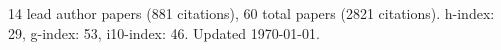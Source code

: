 14 lead author papers (881 citations),
60 total papers (2821 citations).\newline
h-index: 29, g-index: 53, i10-index: 46. Updated \today.